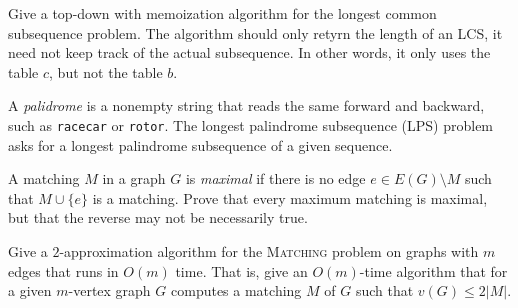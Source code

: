 
\question Give a top-down with memoization algorithm for the longest common subsequence problem. 
The algorithm should only retyrn the length of an LCS, it need not keep track of the actual subsequence. 
In other words, it only uses the table $c$, but not the table $b$.

\question A \emph{palidrome} is a nonempty string that reads the same forward and backward, such as \texttt{racecar} or \texttt{rotor}. 
The longest palindrome subsequence (LPS) problem asks for a longest palindrome subsequence of a given sequence.

\question A matching $M$ in a graph $G$ is \emph{maximal} if there is no edge $e \in E(G) \setminus M$ such that $M \cup \{e\}$ is a matching.
Prove that every maximum matching is maximal, 
but that the reverse may not be necessarily true.

\question Give a $2$-approximation algorithm for the \textsc{Matching} problem on graphs with $m$ edges that runs in $O(m)$ time. 
That is, give an $O(m)$-time algorithm that for a given $m$-vertex graph $G$ computes a matching $M$ of $G$ such that $v(G) \leq 2 \lvert M \rvert$.
